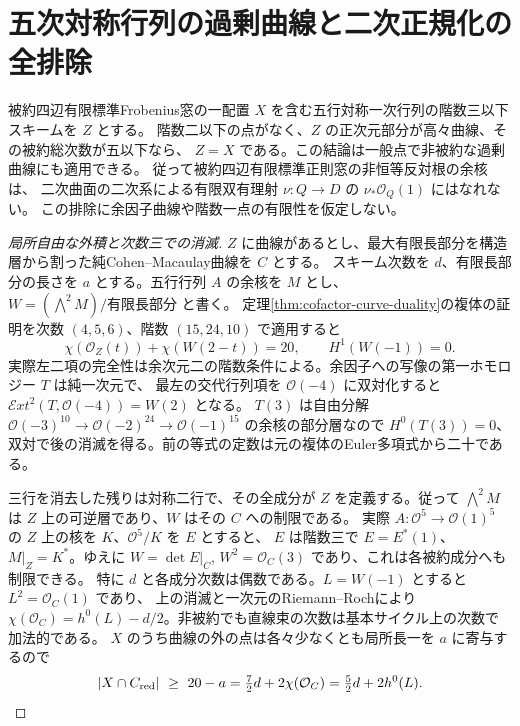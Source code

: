 \section{五次対称行列の過剰曲線と二次正規化の全排除}
\label{sec:quintic-web-curve-excess}
\begin{theorem}\label{thm:quintic-web-curve-excess}
被約四辺有限標準Frobenius窓の一配置 $X$ を含む五行対称一次行列の階数三以下スキームを $Z$ とする。
階数二以下の点がなく、$Z$ の正次元部分が高々曲線、その被約総次数が五以下なら、
$Z=X$ である。この結論は一般点で非被約な過剰曲線にも適用できる。
従って被約四辺有限標準正則窓の非恒等反対根の余核は、
二次曲面の二次系による有限双有理射 $\nu:Q\to D$ の $\nu_*\mathcal O_Q(1)$ にはなれない。
この排除に余因子曲線や階数一点の有限性を仮定しない。
\end{theorem}
\begin{proof}[局所自由な外積と次数三での消滅]
$Z$ に曲線があるとし、最大有限長部分を構造層から割った純Cohen--Macaulay曲線を $C$ とする。
スキーム次数を $d$、有限長部分の長さを $a$ とする。五行行列 $A$ の余核を $M$ とし、
$W=(\bigwedge^2 M)/\text{有限長部分}$ と書く。
定理\ref{thm:cofactor-curve-duality}の複体の証明を次数 $(4,5,6)$、階数 $(15,24,10)$ で適用すると
\[
         \chi(\mathcal O_Z(t))+\chi(W(2-t))=20,\qquad H^1(W(-1))=0 .
\]
実際左二項の完全性は余次元二の階数条件による。余因子への写像の第一ホモロジー $T$ は純一次元で、
最左の交代行列項を $\mathcal O(-4)$ に双対化すると
$\mathcal Ext^2(T,\mathcal O(-4))=W(2)$ となる。
$T(3)$ は自由分解 $\mathcal O(-3)^{10}\to\mathcal O(-2)^{24}\to\mathcal O(-1)^{15}$ の余核の部分層なので
$H^0(T(3))=0$、双対で後の消滅を得る。前の等式の定数は元の複体のEuler多項式から二十である。

三行を消去した残りは対称二行で、その全成分が $Z$ を定義する。従って $\bigwedge^2 M$ は
$Z$ 上の可逆層であり、$W$ はその $C$ への制限である。
実際 $A:\mathcal O^5\to\mathcal O(1)^5$ の $Z$ 上の核を $K$、$\mathcal O^5/K$ を $E$ とすると、
$E$ は階数三で $E=E^*(1)$、$M|_Z=K^*$。ゆえに
$W=\det E|_C$, $W^2=\mathcal O_C(3)$ であり、これは各被約成分へも制限できる。
特に $d$ と各成分次数は偶数である。$L=W(-1)$ とすると $L^2=\mathcal O_C(1)$ であり、
上の消滅と一次元のRiemann--Rochにより
$\chi(\mathcal O_C)=h^0(L)-d/2$。非被約でも直線束の次数は基本サイクル上の次数で加法的である。
$X$ のうち曲線の外の点は各々少なくとも局所長一を $a$ に寄与するので
\[
 |X\cap C_{\rm red}|\ \ge\ 20-a
   =\tfrac72 d+2\chi(\mathcal O_C)=\tfrac52 d+2h^0(L).
\]

\end{proof}
